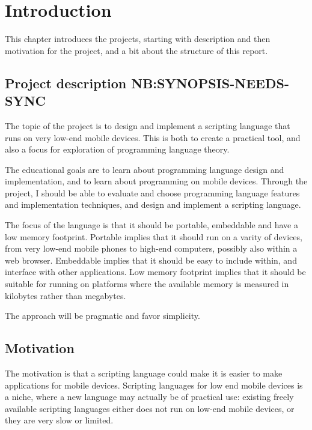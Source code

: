 \chapter{Introduction}
This chapter introduces the projects, starting with description and then motivation for the project, and a bit about the structure of this report.


\section{Project description NB:SYNOPSIS-NEEDS-SYNC}
    The topic of the project is to design and implement a scripting language
that runs on very low-end mobile devices. This is both to create a practical tool, and
also a focus for exploration of programming language theory. 

\begin{comment}
The motivation is that a scripting language makes it is easier to make applications for mobile 
devices, and that existing freely available scripting languages
are very limited, slow, or simply does not run on the low-end mobile devices.
\end{comment}

    The educational goals are to learn about programming language design and
implementation, and to learn about programming on mobile devices. Through the
project, I should be able to evaluate and choose programming language features
and implementation techniques, and design and implement a scripting language.

    The focus of the language is that it should be portable, embeddable and have
a low memory footprint. Portable implies that it should run on a varity of devices,
from very low-end mobile phones to high-end computers, possibly also within a web browser. 
Embeddable implies that it should be easy to include within, and interface with
other applications. Low memory footprint implies that it should be suitable for
running on platforms where the available memory is measured in kilobytes rather
than megabytes. 

    The approach will be pragmatic and favor simplicity.

\section{Motivation}

The motivation is that a scripting language could make it is easier to make applications for mobile devices.
Scripting languages for low end mobile devices is a niche, 
where a new language may actually be of practical use:
existing freely available scripting languages either does not run on low-end mobile devices, or they are very slow or limited.

